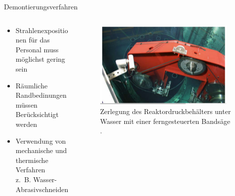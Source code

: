 \begin{frame}{Demontierungsverfahren}
  \begin{columns}

    \begin{column}{0.48\textwidth}
    \begin{itemize}
      \setlength\itemsep{1.2em}
      \item{ Strahlenexpositionen für das Personal muss möglichst gering sein }
      \item{ Räumliche Randbedinungen müssen Berücksichtigt werden}
      \item{ Verwendung von mechanische und thermische Verfahren  \\ z.\, B. Wasser-Abrasivschneiden}

    \end{itemize}

    \end{column}

    \begin{column}{0.48\textwidth}
      \begin{figure}
         \centering
         \includegraphics[width=0.95\textwidth]{./bilder/zerlegung_bandsaege.PNG}
         \caption{Zerlegung des Reaktordruckbehälters unter Wasser mit einer ferngesteuerten Bandsäge \cite{stilllegung_grs}. }
         \label{ fig: abbau_roboter}
       \end{figure}
    \end{column}

  \end{columns}
\end{frame}



